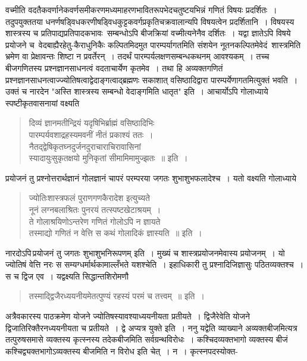 \documentclass[11pt, openany]{book}
\begin{document}
\newpage

\begin{sloppypar}
\noindent वच्मीति वदतैकवर्णानेकवर्णसमीकरणमध्यमाहरणभावितरूपभेदचतुष्टयभिन्नं गणितं विषयः प्रदर्शितः~। तदुपयुक्ततया धनर्णषड्विधकरणीषड्विधकुट्टकवर्गप्रकृतिचक्रवालान्यपि विषयत्वेन प्रदर्शितानि~। विषयस्य शास्त्रस्य च प्रतिपाद्यप्रतिपादकभावः~सम्बन्धोऽपि बीजक्रियां वच्मीत्यनेनैव दर्शितः~। यद्वा ज्ञातेऽपि विषये प्रयोजने च~वेदबाह्यैरहेतु-कैराधुनिकैः कल्पितमिदमुत पारम्पर्यागतमिति संशयेन नूतनकल्पितमेवेदं~शास्त्रमिति भ्रमेण वा प्रेक्षावन्तः शिष्टा न प्रवर्तेरन्~। तदर्थं पारम्पर्यलक्षणसम्बन्धकथनम् आवश्यकम्~। तच्च बीजगणितस्य प्रश्नज्ञानसाधनत्वं वदताचार्येण कृतमेव~। तथा हि अव्यक्तगणितं प्रश्नज्ञानसाधनत्वाज्ज्योतिषत्वाद्वेदाङ्गत्वाद्ब्रह्मणः सकाशात् वसिष्ठादिद्वारा पारम्पर्येणागतमित्युक्तं भवति~। उक्तं च {\color{violet}नारदेन "अस्ति शास्त्रस्य सम्बन्धो वेदाङ्गमिति धातृत"} इति~। आचार्योऽपि {\color{violet}गोलाध्याये} स्पष्टीकृतवासनायां वक्ष्यति\textendash 

\begin{quote}
{\color{violet}दिव्यं ज्ञानमतीन्द्रियं यदृषिभिर्ब्राह्मं वसिष्ठादिभिः\\
पारम्पर्यवशाद्रहस्यमवनीं नीतं प्रकाश्यं ततः~।\\
नैतद्द्वेषिकृतघ्नदुर्जनदुराचाराचिरावासिनां \\
स्यादायुःसुकृतक्षयो मुनिकृतां सीमामिमामुज्झतः~॥} इति~।
\end{quote}

प्रयोजनं तु प्रश्नोत्तरार्थज्ञानं गोलज्ञानं चापरं परम्परया जगतः शुभाशुभफलादेश्च~। यतो वक्ष्यति {\color{violet}गोलाध्याये\textendash }

\begin{quote}
{\color{violet}ज्योतिःशास्त्रफलं पुराणगणकैरादेश इत्युच्यते \\
नूनं लग्नबलाश्रितः पुनरयं तत्स्पष्टखेटाश्रयम्~।\\
ते गोलाश्रयिणोऽन्तरेण गणितं गोलोऽपि न ज्ञायते \\
तस्माद्यो गणितं न वेत्ति स कथं गोलादिकं ज्ञास्यति~॥} इति~।
\end{quote}

{\color{violet}नारदो}ऽपि\textendash \,{\color{violet}प्रयोजनं तु जगतः शुभाशुभनिरूपणम्} इति~। मुख्यं च शास्त्रप्रयोजनमेवास्य प्रयोजनम्~। यो ज्योतिषं वेत्ति नरः स सम्यग्धर्मार्थकामाल्लँभते यशश्चेति~। इहाधिकारी तु प्रश्नादिजिज्ञासुः पठितव्यक्तश्च~। स च द्विज एव~। यद्वक्ष्यति {\color{violet}सिद्धान्तशिरोमणौ\textendash }

\begin{quote}
{\color{violet}तस्माद्द्विजैरध्ययनीयमेतत्पुण्यं रहस्यं परमं च तत्त्वम्~॥} इति~।
\end{quote}

अत्रैवकारस्य पाठक्रमेण योजने ज्योतिषस्यावश्याध्ययनीयता प्रतीयते~। द्विजैरेवेति योजने द्विजातिरिक्तैरनध्ययनीयता च प्रतीयते~। द्वे अप्यत्र युक्ते इति~। ननु यद्वेति व्याख्याने अव्यक्तबीजमित्यत्र तत्पुरुषसमासे व्यक्तस्य कृत्स्नस्य तदेकबीजमिति सर्वग्रन्थविरोधः~। कश्चिदव्यक्तभागो व्यक्तस्य बीजं कश्चिद्व्यक्तभागोऽव्यक्तस्य बीजमिति न विरोध इति चेत्~। न~। कृत्स्नपदस्योक्त-
\end{sloppypar}
\end{document}
